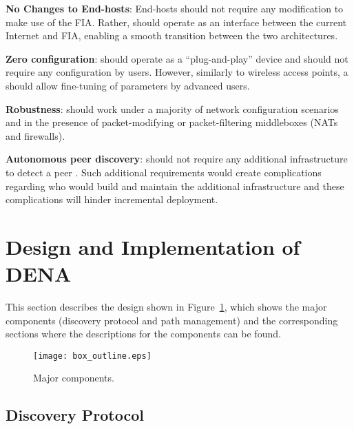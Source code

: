 \begin{ReqR}
\setlength{\itemsep}{-3pt}

    \item{\textbf{No Changes to End-hosts}}: End-hosts should not require any
modification to make use of the FIA. Rather, \name should operate as an
interface between the current Internet and FIA, enabling a smooth transition
between the two architectures.  \label{itm:no-change}

    \item{\textbf{Zero configuration}}: \name should operate as a
``plug-and-play'' device and should not require any configuration by users.
However, similarly to wireless access points, a \name should allow fine-tuning
of parameters by advanced users.  \label{itm:zero-config}

    \item{\textbf{Robustness}}: \name should work under a majority of network
configuration scenarios and in the presence of packet-modifying or
packet-filtering middleboxes (\eg NATs and firewalls).  \label{itm:minimal}

    \item{\textbf{Autonomous peer discovery}}: \name should not require any
additional infrastructure to detect a peer \name. Such additional requirements
would create complications regarding who would build and maintain the
additional infrastructure and these complications will hinder incremental
deployment.  \label{itm:self-disc}

\end{ReqR}

\section{Design and Implementation of DENA}
\label{sec:design}
This section describes the \name design shown in Figure~\ref{fig:box_outline},
which shows the major components (discovery protocol and path management) and
the corresponding sections where the descriptions for the components can be
found.

\begin{figure}[h]
\centering
\texttt{[image: box\_outline.eps]}
\caption{Major \name components.}
\label{fig:box_outline}
\end{figure}

\subsection{Discovery Protocol}
\label{subsection:Discovery}

